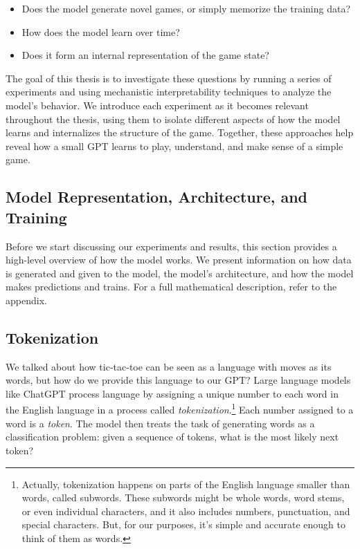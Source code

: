 \documentclass[11pt]{article}
\providecommand{\tightlist}{%
      \setlength{\itemsep}{0pt}\setlength{\parskip}{0pt}}
\begin{document}
\begin{itemize}
\tightlist
\item
  Does the model generate novel games, or simply memorize the training
  data?
\item
  How does the model learn over time?
\item
  Does it form an internal representation of the game state?
\end{itemize}

The goal of this thesis is to investigate these questions by running a
series of experiments and using mechanistic interpretability techniques
to analyze the model's behavior. We introduce each experiment as it
becomes relevant throughout the thesis, using them to isolate different
aspects of how the model learns and internalizes the structure of the
game. Together, these approaches help reveal how a small GPT learns to
play, understand, and make sense of a simple game.

    \subsection{Model Representation, Architecture, and
Training}\label{model-representation-architecture-and-training}

Before we start discussing our experiments and results, this section
provides a high-level overview of how the model works. We
present information on how data is generated and given to the model, the
model's architecture, and how the model makes predictions and trains.
For a full mathematical description, refer to the appendix.

\subsection{Tokenization}\label{tokenization}

We talked about how tic-tac-toe can be seen as a language with moves as
its words, but how do we provide this language to our GPT? Large
language models like ChatGPT process language by assigning a unique
number to each word in the English language in a process called
\emph{tokenization}.\footnote{Actually, tokenization happens on parts of the English
language smaller than words, called subwords. These subwords might be
whole words, word stems, or even individual characters, and it also
includes numbers, punctuation, and special characters. But, for our
purposes, it's simple and accurate enough to think of them as words.} Each number assigned to a word is a
\emph{token}. The model then treats the task of generating words as a
classification problem: given a sequence of tokens, what is the most
likely next token?
\end{document}
